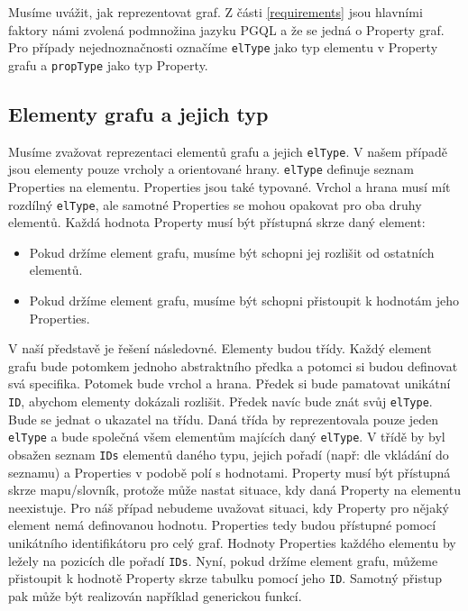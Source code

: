 Musíme uvážit, jak reprezentovat graf.
Z části \ref{requirements} jsou hlavními faktory námi zvolená podmnožina jazyku PGQL a že se jedná o Property graf.
Pro případy nejednoznačnosti označíme \verb+elType+ jako typ elementu v Property grafu a \verb+propType+ jako typ Property.

\subsection{Elementy grafu a jejich typ}

Musíme zvažovat reprezentaci elementů grafu a jejich \verb+elType+.
V našem případě jsou elementy pouze vrcholy a orientované hrany.
\verb+elType+ definuje seznam Properties na elementu. 
Properties jsou také typované.
Vrchol a hrana musí mít rozdílný \verb+elType+, ale samotné Properties se mohou opakovat pro oba druhy elementů.
Každá hodnota Property musí být přístupná skrze daný element:

\begin{itemize}

\item Pokud držíme element grafu, musíme být schopni jej rozlišit od ostatních elementů.

\item Pokud držíme element grafu, musíme být schopni přistoupit k hodnotám jeho Properties.

\end{itemize}

V naší představě je řešení následovné.
Elementy budou třídy.
Každý element grafu bude potomkem jednoho abstraktního předka a potomci si budou definovat svá specifika.
Potomek bude vrchol a hrana.
Předek si bude pamatovat unikátní \verb+ID+, abychom elementy dokázali rozlišit. 
Předek navíc bude znát svůj \verb+elType+. 
Bude se jednat o ukazatel na třídu.
Daná třída by reprezentovala pouze jeden \verb+elType+ a bude společná všem elementům majících daný \verb+elType+.
V třídě by byl obsažen seznam \verb+IDs+ elementů daného typu, jejich pořadí (např: dle vkládání do seznamu) a Properties v podobě polí s hodnotami.
Property musí být přístupná skrze mapu/slovník, protože může nastat situace, kdy daná Property na elementu neexistuje. 
Pro náš případ nebudeme uvažovat situaci, kdy Property pro nějaký element nemá definovanou hodnotu.
Properties tedy budou přístupné pomocí unikátního identifikátoru pro celý graf.
Hodnoty Properties každého elementu by ležely na pozicích dle pořadí \verb+IDs+.
Nyní, pokud držíme element grafu, můžeme přistoupit k hodnotě Property skrze tabulku pomocí jeho \verb+ID+.    
Samotný přistup pak může být realizován například generickou funkcí. 

